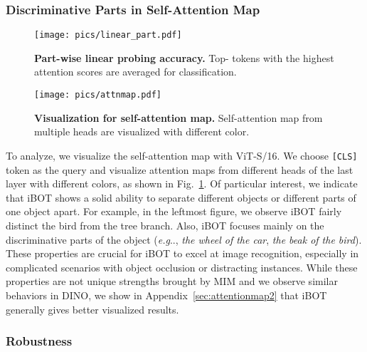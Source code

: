 \documentclass{article} \usepackage{iclr2022_conference,times}
\makeatletter
\def\ourmethod{{iBOT}\xspace}
\DeclareRobustCommand\onedot{\futurelet\@let@token\@onedot}
\def\@onedot{\ifx\@let@token.\else.\null\fi\xspace}
\def\eg{\emph{e.g}\onedot} \def\Eg{\emph{E.g}\onedot}
\makeatother
\begin{document}
\subsubsection{Discriminative Parts in Self-Attention Map}
\label{sec:attentionmap}

\begin{figure}[!t]
\begin{minipage}[c]{.5\linewidth}
\centering
\texttt{[image: pics/linear\_part.pdf]}
\vspace{-0.8cm}
\captionsetup{width=.9\linewidth}
\caption{\textbf{Part-wise linear probing accuracy.} Top- tokens with the highest attention scores are averaged for classification. }
\label{fig:partlinear}
\end{minipage}\begin{minipage}[c]{.5\linewidth}
\centering
\texttt{[image: pics/attnmap.pdf]}
\captionsetup{width=.95\linewidth}
\caption{\textbf{Visualization for self-attention map.} Self-attention map from multiple heads are visualized with different color.}
\label{fig:attn}
\end{minipage}
\vspace{-0.3cm}
\end{figure}

To analyze, we visualize the self-attention map with ViT-S/16. 
We choose \texttt{[CLS]} token as the query and visualize attention maps from different heads of the last layer with different colors, as shown in Fig.~\ref{fig:attn}. 
Of particular interest, we indicate that \ourmethod shows a solid ability to separate different objects or different parts of one object apart. For example, in the leftmost figure, we observe \ourmethod fairly distinct the bird from the tree branch. 
Also, \ourmethod focuses mainly on the discriminative parts of the object (\eg, \textit{the wheel of the car}, \textit{the beak of the bird}).
These properties are crucial for \ourmethod to excel at image recognition, especially in complicated scenarios with object occlusion or distracting instances.
While these properties are not unique strengths brought by MIM and we observe similar behaviors in DINO, we show in Appendix~\ref{sec:attentionmap2} that \ourmethod generally gives better visualized results.

\subsubsection{Robustness}
\label{sec:robustness}
\end{document}
